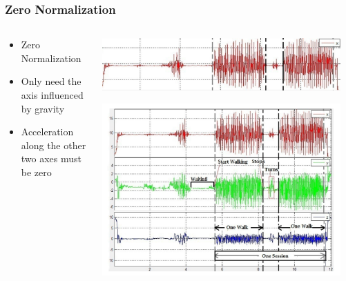 \documentclass{beamer}
\begin{document}
\begin{frame}
  \frametitle{Zero Normalization}
  \begin{columns}
  \begin{column}{0.4\textwidth}
  \begin{itemize}
    \item Zero Normalization 
  	\linebreak
  	\item Only need the axis influenced by gravity
  	\linebreak
  	\item Acceleration along the other two axes must be zero
  \end{itemize}
  \end{column}  
  
\begin{column}{0.5\textwidth}

\includegraphics[width=0.95\textwidth]{Illustrations/onegaitcycle.png}

\includegraphics[width=0.95\textwidth]{Illustrations/gaitpatterns.png}

\end{column}   
  
  \end{columns}
\end{frame}
\end{document}
